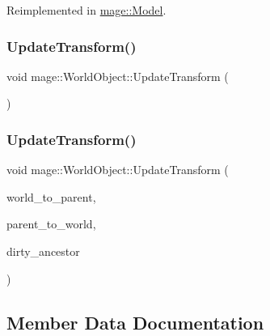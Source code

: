 Reimplemented in \hyperlink{classmage_1_1_model_a2f3c812220367093bdca125e6b6e898a}{mage\+::\+Model}.

\hypertarget{classmage_1_1_world_object_a5ab5e580caa80d93a3c8b44d18ee2848}{}\label{classmage_1_1_world_object_a5ab5e580caa80d93a3c8b44d18ee2848} 
\subsubsection{\texorpdfstring{Update\+Transform()}{UpdateTransform()}\hspace{0.1cm}{\footnotesize\ttfamily [1/2]}}
{\footnotesize\ttfamily void mage\+::\+World\+Object\+::\+Update\+Transform (\begin{DoxyParamCaption}{ }\end{DoxyParamCaption})}

\hypertarget{classmage_1_1_world_object_a1c4736646ad66488fe2e0706a784924d}{}\label{classmage_1_1_world_object_a1c4736646ad66488fe2e0706a784924d} 
\subsubsection{\texorpdfstring{Update\+Transform()}{UpdateTransform()}\hspace{0.1cm}{\footnotesize\ttfamily [2/2]}}
{\footnotesize\ttfamily void mage\+::\+World\+Object\+::\+Update\+Transform (\begin{DoxyParamCaption}\item[{const X\+M\+M\+A\+T\+R\+IX \&}]{world\+\_\+to\+\_\+parent,  }\item[{const X\+M\+M\+A\+T\+R\+IX \&}]{parent\+\_\+to\+\_\+world,  }\item[{bool}]{dirty\+\_\+ancestor }\end{DoxyParamCaption})}



\subsection{Member Data Documentation}
\hypertarget{classmage_1_1_world_object_a383cc5e1275f389459021a16b958049c}{}\label{classmage_1_1_world_object_a383cc5e1275f389459021a16b958049c} 
